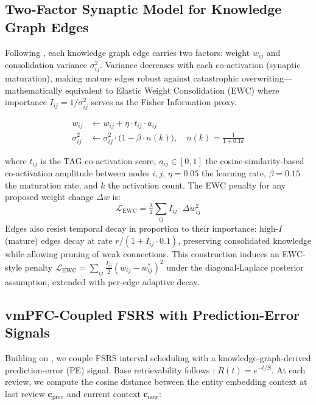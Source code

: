 \documentclass{article}
\begin{document}
\subsection{Two-Factor Synaptic Model for Knowledge Graph Edges}
\label{sec:twofactor}

Following \citet{zenke2025}, each knowledge graph edge carries two factors:
weight $w_{ij}$ and consolidation variance $\sigma^2_{ij}$.
Variance decreases with each co-activation (synaptic maturation),
making mature edges robust against catastrophic overwriting---
mathematically equivalent to Elastic Weight Consolidation (EWC)
\citep{kirkpatrick2017,zenke2017} where importance
$I_{ij} = 1/\sigma^2_{ij}$ serves as the Fisher Information proxy.

\begin{align}
    w_{ij} &\leftarrow w_{ij} + \eta \cdot t_{ij} \cdot a_{ij} \label{eq:weight} \\
    \sigma^2_{ij} &\leftarrow \sigma^2_{ij} \cdot \bigl(1 - \beta \cdot n(k)\bigr), \quad
    n(k) = \tfrac{1}{1 + 0.1k} \label{eq:variance}
\end{align}

where $t_{ij}$ is the TAG co-activation score,
$a_{ij}\in[0,1]$ the cosine-similarity-based co-activation amplitude
between nodes $i,j$, $\eta=0.05$ the learning rate, $\beta=0.15$ the
maturation rate, and $k$ the activation count.
The EWC penalty for any proposed weight change $\Delta w$ is:
\begin{equation}
    \mathcal{L}_{\mathrm{EWC}} = \tfrac{\lambda}{2} \sum_{ij} I_{ij} \cdot \Delta w_{ij}^2
\end{equation}
Edges also resist temporal decay in proportion to their importance:
high-$I$ (mature) edges decay at rate $r/(1 + I_{ij} \cdot 0.1)$,
preserving consolidated knowledge while allowing pruning of weak
connections. This construction induces an EWC-style penalty
$\mathcal{L}_{\mathrm{EWC}}=\sum_{ij}\frac{I_{ij}}{2}(w_{ij}-w_{ij}^\ast)^2$
\citep{kirkpatrick2017,zenke2017} under the diagonal-Laplace
posterior assumption, extended with per-edge adaptive decay.

\subsection{vmPFC-Coupled FSRS with Prediction-Error Signals}
\label{sec:vmpfc}

Building on \citet{zou2025}, we couple FSRS interval scheduling with a
knowledge-graph-derived prediction-error (PE) signal.
Base retrievability follows \citet{ebbinghaus1885}: $R(t) = e^{-t/S}$.
At each review, we compute the cosine distance between the entity embedding
context at last review $\mathbf{c}_{\text{prev}}$ and current context $\mathbf{c}_{\text{now}}$:
\end{document}
